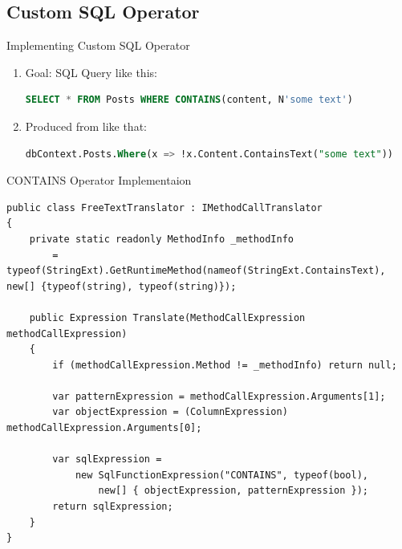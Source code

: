 \documentclass{bredelebeamer}
\begin{document}
\subsection{Custom SQL Operator}
\begin{frame}[fragile]{Implementing Custom SQL Operator}
    \begin{enumerate}[<+->]
        \item {
            Goal: SQL Query like this:
            \begin{lstlisting}[language=SQL]
    SELECT * FROM Posts WHERE CONTAINS(content, N'some text')
            \end{lstlisting}
        }
        \item {
            Produced from like that:
            \begin{lstlisting}[language=SQL]
    dbContext.Posts.Where(x => !x.Content.ContainsText("some text"))
            \end{lstlisting}
        }
    \end{enumerate}
\end{frame}
\begin{frame}[fragile]{CONTAINS Operator Implementaion}
    \begin{lstlisting}
public class FreeTextTranslator : IMethodCallTranslator
{
    private static readonly MethodInfo _methodInfo
        = typeof(StringExt).GetRuntimeMethod(nameof(StringExt.ContainsText), new[] {typeof(string), typeof(string)});

    public Expression Translate(MethodCallExpression methodCallExpression)
    {
        if (methodCallExpression.Method != _methodInfo) return null;

        var patternExpression = methodCallExpression.Arguments[1];
        var objectExpression = (ColumnExpression) methodCallExpression.Arguments[0];

        var sqlExpression =
            new SqlFunctionExpression("CONTAINS", typeof(bool),
                new[] { objectExpression, patternExpression });
        return sqlExpression;
    }
}
    \end{lstlisting}
\end{frame}
\end{document}
